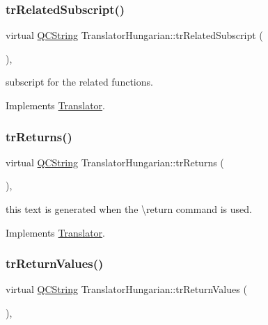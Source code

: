 \subsubsection{\texorpdfstring{trRelatedSubscript()}{trRelatedSubscript()}}
{\footnotesize\ttfamily virtual \mbox{\hyperlink{class_q_c_string}{Q\+C\+String}} Translator\+Hungarian\+::tr\+Related\+Subscript (\begin{DoxyParamCaption}{ }\end{DoxyParamCaption})\hspace{0.3cm}{\ttfamily [inline]}, {\ttfamily [virtual]}}

subscript for the related functions. 

Implements \mbox{\hyperlink{class_translator}{Translator}}.

\mbox{\label{class_translator_hungarian_aebae5917bdbdbbe764804505b67706b5}} 
\subsubsection{\texorpdfstring{trReturns()}{trReturns()}}
{\footnotesize\ttfamily virtual \mbox{\hyperlink{class_q_c_string}{Q\+C\+String}} Translator\+Hungarian\+::tr\+Returns (\begin{DoxyParamCaption}{ }\end{DoxyParamCaption})\hspace{0.3cm}{\ttfamily [inline]}, {\ttfamily [virtual]}}

this text is generated when the \textbackslash{}return command is used. 

Implements \mbox{\hyperlink{class_translator}{Translator}}.

\mbox{\label{class_translator_hungarian_a4d332a5f61257acc9e3da2f0875f0b1b}} 
\subsubsection{\texorpdfstring{trReturnValues()}{trReturnValues()}}
{\footnotesize\ttfamily virtual \mbox{\hyperlink{class_q_c_string}{Q\+C\+String}} Translator\+Hungarian\+::tr\+Return\+Values (\begin{DoxyParamCaption}{ }\end{DoxyParamCaption})\hspace{0.3cm}{\ttfamily [inline]}, {\ttfamily [virtual]}}


